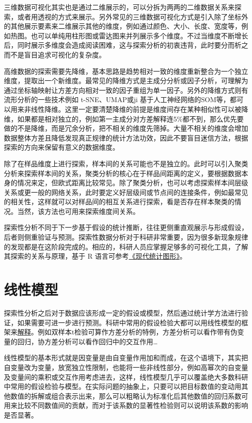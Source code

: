 \documentclass[]{tufte-book}
\begin{document}
三维数据可视化其实也是通过二维展示的，可以分拆为两两的二维数据关系来探索，或者用透视的方式来展示。另外常见的三维数据可视化方式是引入除了坐标外的其他展示要素来二维展示其他的维度，例如通过颜色、大小、长度、宽度等，例如热图。也可以单纯用柱形图或雷达图来并列展示多个维度。不过当维度不断增长后，同时展示多维度会造成阅读困难，这与探索分析的初衷违背，此时要分而析之而不是盲目追求可视化的复杂度。

高维数据的探索需要先降维，基本思路是趋势相对一致的维度重新整合为一个独立维度，提取出一个新维度。最常见的降维方式是主成分分析或因子分析，可理解为通过坐标轴映射让方差方向相对一致的因子重组为单一因子。另外的降维方式则有流形分析的一些技术例如 t-SNE、UMAP或ji 基于人工神经网络的SOM等，都可以用来非线性降维。这里一定要清楚降维的前提是维度间存在某种相似性可以被降维，如果都是相对独立的，例如第一主成分对方差解释连5\%都不到，那么优先要做的不是降维，而是冗余分析，把不相关的维度先筛掉。大量不相关的维度会增加数据整体方差且降低发现真正规律的统计方法功效，因此不要盲目迷信方法，根据探索的方向来保留有意义的数据维度。

除了在样品维度上进行探索，样本间的关系可能也不是独立的。此时可以引入聚类分析来探索样本间的关系，聚类分析的核心在于样品间距离的定义，要根据数据本身的情况来定，但欧式距离比较常见。除了聚类分析，也可以考虑探索样本间层级关系或更一般的网络关系，此时要定义好层级间或节点间的连接条件，例如最常见的相关性，这样就可以对样品间的相互关系进行探索，看是否存在样本聚类的情况。当然，该方法也可用来探索维度间关系。

探索性分析不同于下一步基于假设的统计推断，往往更侧重直观展示与形成假设，后者则侧重验证与预测。探索性数据分析对于科研非常重要，因为很多新现象规律的发现都是在这阶段完成的。相应的，科研人员应掌握足够多的可视化工具，了解其探索的关系与原理，基于 R 语言可参考\href{https://bookdown.org/xiangyun/msg/}{《现代统计图形》}。

\hypertarget{ux7ebfux6027ux6a21ux578b}{%
\section{线性模型}\label{ux7ebfux6027ux6a21ux578b}}

探索性分析之后对于数据应该形成一定的假设或模型，然后通过统计学方法进行验证，如果需要可进一步进行预测。科研中常用的假设检验大都可以用线性模型的框架来\href{https://cosx.org/2019/09/common-tests-as-linear-models/}{解释}。例如双样本t检验可算作方差分析的特例，方差分析可以看作带有伪变量的回归，协方差分析可以看作回归中的交互作用\ldots{}

线性模型的基本形式就是因变量是由自变量作用加和而成，在这个语境下，其实把自变量改为变量，放宽独立性限制，也能将一些非线性部分，例如高幂次的自变量及变量间的乘积或交互作用考虑进去，这样，线性模型几乎可以覆盖绝大多数科研中常用的假设检验与模型。在实际问题的抽象上，只要可以把目标数值的变动用其他数值的拆解或组合表示出来，那么可以粗略认为标准化后其他数值的回归系数可用来比较不同数值间的贡献，而对于该系数的显著性检验则可以说明该系数的影响是否显著。
\end{document}
